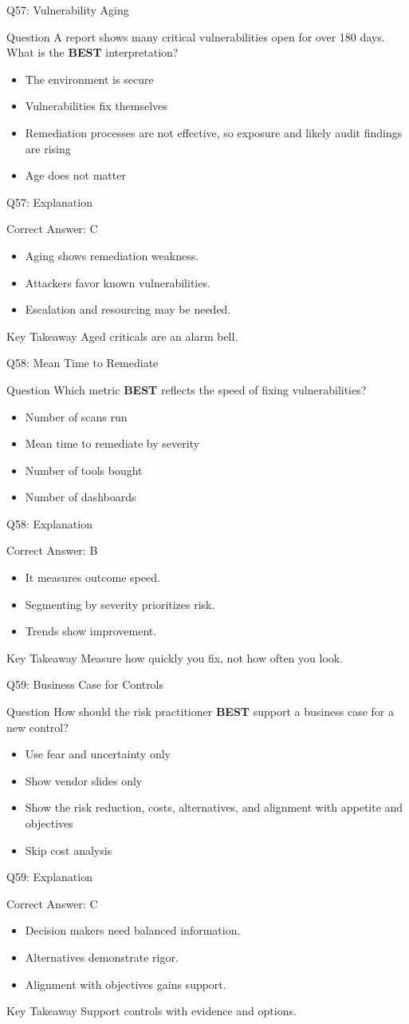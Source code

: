 \documentclass[aspectratio=169]{beamer}
\newcommand{\hq}[7]{%
	\begin{frame}{Q#1: #2}
		\begin{block}{Question}
			#3
		\end{block}
		\begin{itemize}
			#4
		\end{itemize}
	\end{frame}
	\begin{frame}{Q#1: Explanation}
		\begin{block}{Correct Answer: #5}
			\begin{itemize}
				#6
			\end{itemize}
		\end{block}
		\begin{alertblock}{Key Takeaway}
			#7
		\end{alertblock}
	\end{frame}
}
\begin{document}
	\hq{57}{Vulnerability Aging}
	{A report shows many critical vulnerabilities open for over 180 days. What is the \textbf{BEST} interpretation?}
	{\item[\textbf{(A)}] The environment is secure
		\item[\textbf{(B)}] Vulnerabilities fix themselves
		\item[\textbf{(C)}] Remediation processes are not effective, so exposure and likely audit findings are rising
		\item[\textbf{(D)}] Age does not matter}
	{C}
	{\item Aging shows remediation weakness.
		\item Attackers favor known vulnerabilities.
		\item Escalation and resourcing may be needed.}
	{Aged criticals are an alarm bell.}

	\hq{58}{Mean Time to Remediate}
	{Which metric \textbf{BEST} reflects the speed of fixing vulnerabilities?}
	{\item[\textbf{(A)}] Number of scans run
		\item[\textbf{(B)}] Mean time to remediate by severity
		\item[\textbf{(C)}] Number of tools bought
		\item[\textbf{(D)}] Number of dashboards}
	{B}
	{\item It measures outcome speed.
		\item Segmenting by severity prioritizes risk.
		\item Trends show improvement.}
	{Measure how quickly you fix, not how often you look.}

	\hq{59}{Business Case for Controls}
	{How should the risk practitioner \textbf{BEST} support a business case for a new control?}
	{\item[\textbf{(A)}] Use fear and uncertainty only
		\item[\textbf{(B)}] Show vendor slides only
		\item[\textbf{(C)}] Show the risk reduction, costs, alternatives, and alignment with appetite and objectives
		\item[\textbf{(D)}] Skip cost analysis}
	{C}
	{\item Decision makers need balanced information.
		\item Alternatives demonstrate rigor.
		\item Alignment with objectives gains support.}
	{Support controls with evidence and options.}
\end{document}
